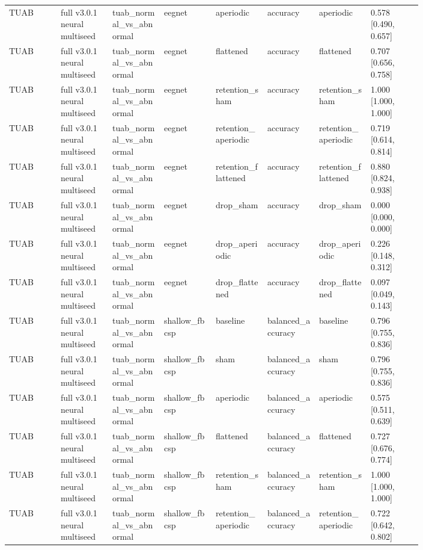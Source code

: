 \begin{longtable}{p{0.10\linewidth}p{0.10\linewidth}p{0.10\linewidth}p{0.10\linewidth}p{0.10\linewidth}p{0.10\linewidth}p{0.10\linewidth}p{0.10\linewidth}}
TUAB & full v3.0.1 neural multiseed & tuab\_normal\_vs\_abnormal & eegnet & aperiodic & accuracy & aperiodic & 0.578 [0.490, 0.657]\\
TUAB & full v3.0.1 neural multiseed & tuab\_normal\_vs\_abnormal & eegnet & flattened & accuracy & flattened & 0.707 [0.656, 0.758]\\
TUAB & full v3.0.1 neural multiseed & tuab\_normal\_vs\_abnormal & eegnet & retention\_sham & accuracy & retention\_sham & 1.000 [1.000, 1.000]\\
TUAB & full v3.0.1 neural multiseed & tuab\_normal\_vs\_abnormal & eegnet & retention\_aperiodic & accuracy & retention\_aperiodic & 0.719 [0.614, 0.814]\\
TUAB & full v3.0.1 neural multiseed & tuab\_normal\_vs\_abnormal & eegnet & retention\_flattened & accuracy & retention\_flattened & 0.880 [0.824, 0.938]\\
TUAB & full v3.0.1 neural multiseed & tuab\_normal\_vs\_abnormal & eegnet & drop\_sham & accuracy & drop\_sham & 0.000 [0.000, 0.000]\\
TUAB & full v3.0.1 neural multiseed & tuab\_normal\_vs\_abnormal & eegnet & drop\_aperiodic & accuracy & drop\_aperiodic & 0.226 [0.148, 0.312]\\
TUAB & full v3.0.1 neural multiseed & tuab\_normal\_vs\_abnormal & eegnet & drop\_flattened & accuracy & drop\_flattened & 0.097 [0.049, 0.143]\\
TUAB & full v3.0.1 neural multiseed & tuab\_normal\_vs\_abnormal & shallow\_fbcsp & baseline & balanced\_accuracy & baseline & 0.796 [0.755, 0.836]\\
TUAB & full v3.0.1 neural multiseed & tuab\_normal\_vs\_abnormal & shallow\_fbcsp & sham & balanced\_accuracy & sham & 0.796 [0.755, 0.836]\\
TUAB & full v3.0.1 neural multiseed & tuab\_normal\_vs\_abnormal & shallow\_fbcsp & aperiodic & balanced\_accuracy & aperiodic & 0.575 [0.511, 0.639]\\
TUAB & full v3.0.1 neural multiseed & tuab\_normal\_vs\_abnormal & shallow\_fbcsp & flattened & balanced\_accuracy & flattened & 0.727 [0.676, 0.774]\\
TUAB & full v3.0.1 neural multiseed & tuab\_normal\_vs\_abnormal & shallow\_fbcsp & retention\_sham & balanced\_accuracy & retention\_sham & 1.000 [1.000, 1.000]\\
TUAB & full v3.0.1 neural multiseed & tuab\_normal\_vs\_abnormal & shallow\_fbcsp & retention\_aperiodic & balanced\_accuracy & retention\_aperiodic & 0.722 [0.642, 0.802]\\

\end{longtable}
